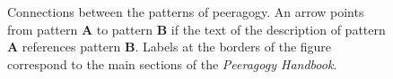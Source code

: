 \afterpage{\clearpage}
\begin{figure}[p]
\vspace{-.9in}
{\centering


\par
}
\vspace{-.9in}
\caption{Connections between the patterns of peeragogy.  An arrow points from pattern \textbf{A} to pattern \textbf{B} if the text of the description of pattern \textbf{A} references pattern \textbf{B}.  Labels at the borders of the figure correspond to the main sections of the \emph{Peeragogy Handbook}.\label{fig:connections}}
\end{figure}

